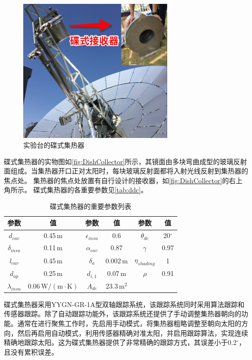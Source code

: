 \begin{figure}[!ht]
\centering
\includegraphics[width=0.7\textwidth]{fig/DishCollector.jpg}
\caption{实验台的碟式集热器}
\label{fig:DishCollector}
\end{figure}
碟式集热器的实物图如\autoref{fig:DishCollector}所示，其镜面由多块弯曲成型的玻璃反射面组成。当集热器开口正对太阳时，每块玻璃反射面都将入射光线反射到集热器的焦点处。
集热器的焦点处放置有自行设计的接收器，如\autoref{fig:DishCollector}的右上角所示。
碟式集热器的各重要参数见\autoref{tab:ddc}。
\begin{table}[htbp]
\setlength{\abovecaptionskip}{0pt}
	\caption{碟式集热器的重要参数列表}
	\centering
	\begin{tabular}{cccccc}
		\toprule
		参数		&	值	&	参数		&	值	&	参数		&	值\\
		\midrule
		$d_{cav}$	&	0.45$\,\mathrm{m}$	&	$\epsilon_{insu}$	&	0.6	&	$\theta_{dc}$	&	20$^\circ$\\
		$\delta_{insu}$	&	0.11$\,\mathrm{m}$	&	$\alpha_{cav}$	&	0.87	&	$\gamma$	&	0.97\\
		$l_{cav}$	&	0.45$\,\mathrm{m}$	&	$\delta_a$		&	0.002$\,\mathrm{m}$	&	$\eta_{shading}$	&	1\\
		$d_{ap}$	&	0.25$\,\mathrm{m}$	&	$d_{i,1}$	&	0.07$\,\mathrm{m}$	&	$\rho$	&	0.91\\
		$\lambda_{insu}$	&	0.06$\,\mathrm{W/(m\cdot K)}$	&	$A_{dc}$	&	23.3$\,\mathrm{m^2}$	&	\\		
		\bottomrule
	\end{tabular}
	\label{tab:ddc}
\end{table}
碟式集热器采用YYGN-GR-1A型双轴跟踪系统，该跟踪系统同时采用算法跟踪和传感器跟踪。除了自动跟踪功能外，该跟踪系统还提供了手动调整集热器朝向的功能。通常在进行聚焦工作时，先启用手动模式，将集热器粗略调整至朝向太阳的方向，然后再启用自动模式，利用传感器精确对准太阳，并启用跟踪算法，实现连续精确地跟踪太阳。这为碟式集热器提供了非常精确的跟踪方式，其误差小于0.2$^\circ$，且没有累积误差。

